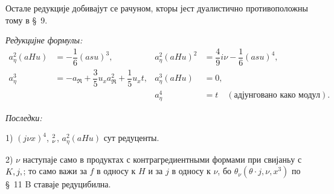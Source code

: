 ﻿\documentclass[11pt]{article}
\let\A\relax
\newcommand{\A}{\mathfrak A}
\newcommand{\R}{\mathfrak R}
\begin{document}
Остале редукције добивајут се рачуном, кторы јест дуалистично противоположны тому в \S\ 9.

\noindent\textit{Редукцијне формулы:}
\[
\tag{11}
\begin{array}{rl|rl}
a_\eta^2(aHu)&=-\dfrac16(asu)^3,&
 a_\eta^2(aHu)^2&=\dfrac49 i\nu-\dfrac16(asu)^4,\\[0.7em]
a_\eta^3&=-a_\R+\dfrac35u_xa_\R^2+\dfrac15u_xt,
& a_\eta^3(aHu)&=0,\\[0.7em]
&&a_\eta^4&=t\quad(\text{адјунговано како модул}).
\end{array}
\]

\noindent\textit{Последки:}

1) $(j\nu x)^4$, $\A_\nu^2$, $a_\eta^2(aHu)$ сут редуценты.

2) $\nu$ наступаје само в продуктах с контрагредиентными формами при свијаньу с $K,j,\A$; то само важи за $f$ в односу к $H$ и за $j$ в односу к $\nu$, бо $\theta_\nu(\theta\cdot j,\nu,x^3)$ по \S\ 11 \mbox{B} ставаје редуцибилна.
\end{document}
